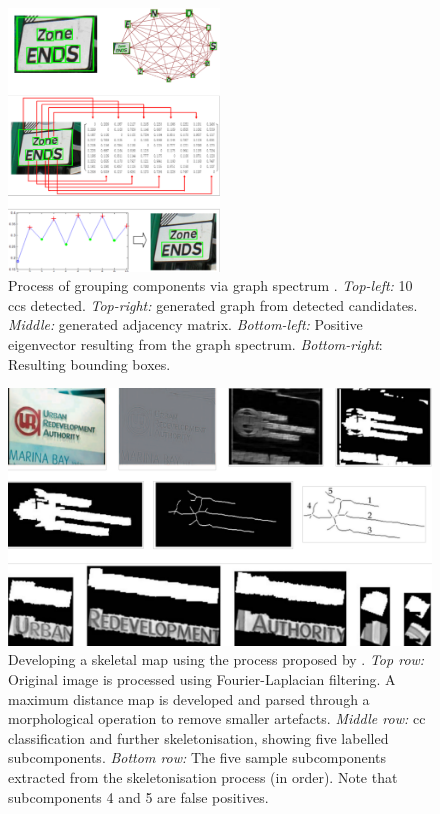 \begin{figure}[p!]
  \centering
  \includegraphics[width=0.5\textwidth]{images/background/zhang2010_graphspectrum}
  \caption[Using graph spectrum to cluster CCs]{Process of grouping components via graph spectrum \citep{Zhang:2010wa}. \textit{Top-left:} 10 \glspl{cc} detected. \textit{Top-right:} generated graph from detected candidates. \textit{Middle:} generated adjacency matrix. \textit{Bottom-left:} Positive eigenvector resulting from the graph spectrum. \textit{Bottom-right}: Resulting bounding boxes.}
  \label{fig:background:detection:cc:zhang2010_graphspectrum}
\end{figure}

\begin{figure}[p!]
  \centering
  \includegraphics[width=\textwidth]{images/background/shivakumara2010_skeleton}
  \caption[Skeletonisation process of CCs]{Developing a skeletal map using the process proposed by \citep{Shivakumara:2011dn}. \textit{Top row:} Original image is processed using Fourier-Laplacian filtering. A maximum distance map is developed and parsed through a morphological operation to remove smaller artefacts. \textit{Middle row:} \gls{cc} classification and further skeletonisation, showing five labelled subcomponents. \textit{Bottom row:} The five sample subcomponents extracted from the skeletonisation process (in order). Note that subcomponents 4 and 5 are false positives.}
  \label{fig:background:detection:cc:shivakumara2010_skeleton}
\end{figure}

